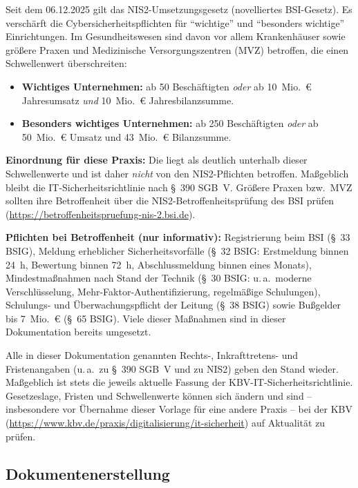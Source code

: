 Seit dem 06.12.2025 gilt das NIS2-Umsetzungsgesetz (novelliertes BSI-Gesetz). Es
verschärft die Cybersicherheitspflichten für \enquote{wichtige} und \enquote{besonders
wichtige} Einrichtungen. Im Gesundheitswesen sind davon vor allem Krankenhäuser sowie
größere Praxen und Medizinische Versorgungszentren (MVZ) betroffen, die einen
Schwellenwert überschreiten:

\begin{itemize}
  \item \textbf{Wichtiges Unternehmen:} ab 50 Beschäftigten \emph{oder} ab 10~Mio.~€
    Jahresumsatz \emph{und} 10~Mio.~€ Jahresbilanzsumme.
  \item \textbf{Besonders wichtiges Unternehmen:} ab 250 Beschäftigten \emph{oder} ab
    50~Mio.~€ Umsatz und 43~Mio.~€ Bilanzsumme.
\end{itemize}

\textbf{Einordnung für diese Praxis:} Die \PraxisName{} liegt als \PraxisGroesse{}
deutlich unterhalb dieser Schwellenwerte und ist daher \emph{nicht} von den
NIS2-Pflichten betroffen. Maßgeblich bleibt die IT-Sicherheitsrichtlinie nach
§~390 SGB~V. Größere Praxen bzw.\ MVZ sollten ihre Betroffenheit über die
NIS2-Betroffenheitsprüfung des BSI prüfen
(\url{https://betroffenheitspruefung-nis-2.bsi.de}).

\textbf{Pflichten bei Betroffenheit (nur informativ):} Registrierung beim BSI
(§~33 BSIG), Meldung erheblicher Sicherheitsvorfälle (§~32 BSIG: Erstmeldung binnen
24~h, Bewertung binnen 72~h, Abschlussmeldung binnen eines Monats), Mindestmaßnahmen nach
Stand der Technik (§~30 BSIG: u.\,a.\ moderne Verschlüsselung,
Mehr-Faktor-Authentifizierung, regelmäßige Schulungen), Schulungs- und
Überwachungspflicht der Leitung (§~38 BSIG) sowie Bußgelder bis 7~Mio.~€ (§~65 BSIG).
Viele dieser Maßnahmen sind in dieser Dokumentation bereits umgesetzt.

\Hinweis Alle in dieser Dokumentation genannten Rechts-, Inkrafttretens- und
Fristenangaben (u.\,a.\ zu §~390 SGB~V und zu NIS2) geben den Stand \RechtsStand{} wieder.
Maßgeblich ist stets die jeweils aktuelle Fassung der KBV-IT-Sicherheitsrichtlinie.
Gesetzeslage, Fristen und Schwellenwerte können sich ändern und sind -- insbesondere vor
Übernahme dieser Vorlage für eine andere Praxis -- bei der KBV
(\url{https://www.kbv.de/praxis/digitalisierung/it-sicherheit}) auf Aktualität zu prüfen.

\subsection{Dokumentenerstellung}

